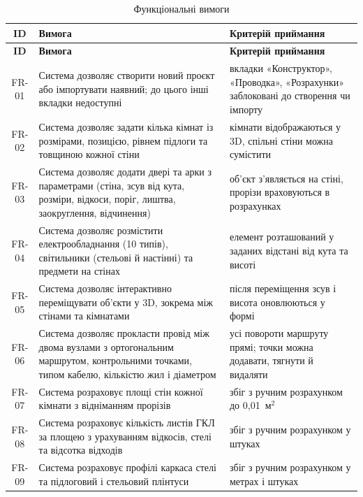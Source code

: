 \begin{spacing}{1.15}
\small\noindent
\begin{xltabular}{\textwidth}{| c | >{\raggedright\arraybackslash}X | >{\raggedright\arraybackslash}X |}
    \caption{Функціональні вимоги} \label{tab:fr} \\
    \hline
    \textbf{ID} & \textbf{Вимога} & \textbf{Критерій приймання} \\ \hline
    \endfirsthead

    \hline
    \textbf{ID} & \textbf{Вимога} & \textbf{Критерій приймання} \\ \hline
    \endhead

    FR-01 & Система дозволяє створити новий проєкт або імпортувати наявний; до цього інші вкладки недоступні & вкладки «Конструктор», «Проводка», «Розрахунки» заблоковані до створення чи імпорту \\ \hline
    FR-02 & Система дозволяє задати кілька кімнат із розмірами, позицією, рівнем підлоги та товщиною кожної стіни & кімнати відображаються у 3D, спільні стіни можна сумістити \\ \hline
    FR-03 & Система дозволяє додати двері та арки з параметрами (стіна, зсув від кута, розміри, відкоси, поріг, лиштва, заокруглення, відчинення) & об'єкт з'являється на стіні, прорізи враховуються в розрахунках \\ \hline
    FR-04 & Система дозволяє розмістити електрообладнання (10 типів), світильники (стельові й настінні) та предмети на стінах & елемент розташований у заданих відстані від кута та висоті \\ \hline
    FR-05 & Система дозволяє інтерактивно переміщувати об'єкти у 3D, зокрема між стінами та кімнатами & після переміщення зсув і висота оновлюються у формі \\ \hline
    FR-06 & Система дозволяє прокласти провід між двома вузлами з ортогональним маршрутом, контрольними точками, типом кабелю, кількістю жил і діаметром & усі повороти маршруту прямі; точки можна додавати, тягнути й видаляти \\ \hline
    FR-07 & Система розраховує площі стін кожної кімнати з відніманням прорізів & збіг з ручним розрахунком до 0,01~м$^2$ \\ \hline
    FR-08 & Система розраховує кількість листів ГКЛ за площею з урахуванням відкосів, стелі та відсотка відходів & збіг з ручним розрахунком у штуках \\ \hline
    FR-09 & Система розраховує профілі каркаса стелі та підлоговий і стельовий плінтуси & збіг з ручним розрахунком у метрах і штуках \\ \hline

\end{xltabular}
\end{spacing}
